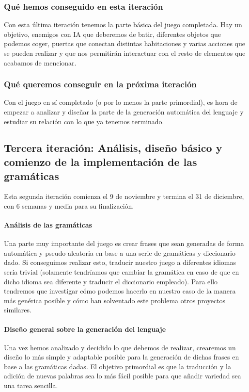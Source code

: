 \subsubsection{Qué hemos conseguido en esta iteración}

Con esta última iteración tenemos la parte básica del juego completada. Hay un objetivo, enemigos con IA que deberemos de batir, diferentes objetos que podemos coger, puertas que conectan distintas habitaciones y varias acciones que se pueden realizar y que nos permitirán interactuar con el resto de elementos que acabamos de mencionar.

\subsubsection{Qué queremos conseguir en la próxima iteración}

Con el juego en sí completado (o por lo menos la parte primordial), es hora de empezar a analizar y diseñar la parte de la generación automática del lenguaje y estudiar su relación con lo que ya tenemos terminado.

\subsection{Tercera iteración: Análisis, diseño básico y comienzo de la implementación de las gramáticas}

Esta segunda iteración comienza el 9 de noviembre y termina el 31 de diciembre, con 6 semanas y media para su finalización.

\paragraph{Análisis de las gramáticas} Una parte muy importante del juego es crear frases que sean generadas de forma automática y pseudo-aleatoria en base a una serie de gramáticas y diccionario dado. Si conseguimos realizar esto, traducir nuestro juego a diferentes idiomas sería trivial (solamente tendríamos que cambiar la gramática en caso de que en dicho idioma sea diferente y traducir el diccionario empleado). Para ello tendremos que investigar cómo podemos hacerlo en nuestro caso de la manera más genérica posible y cómo han solventado este problema otros proyectos similares.

\paragraph{Diseño general sobre la generación del lenguaje} Una vez hemos analizado y decidido lo que debemos de realizar, crearemos un diseño lo más simple y adaptable posible para la generación de dichas frases en base a las gramáticas dadas. El objetivo primordial es que la traducción y la adición de nuevas palabras sea lo más fácil posible para que añadir variedad sea una tarea sencilla.

